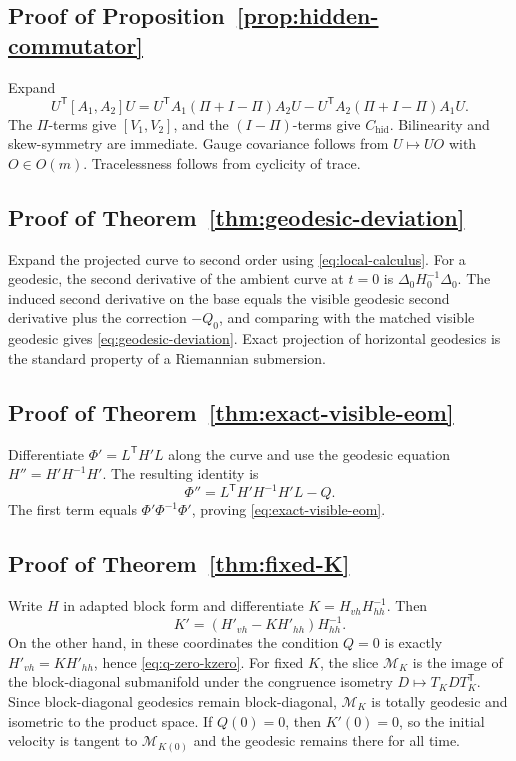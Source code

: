 \documentclass[11pt,a4paper]{article}
\numberwithin{equation}{section}
\theoremstyle{thmcompact}
\theoremstyle{remark}
\begin{document}
\subsection*{Proof of Proposition~\ref{prop:hidden-commutator}}
Expand
\[
U^{\mathsf T}[A_1,A_2]U=U^{\mathsf T}A_1(\Pi+I-\Pi)A_2U-U^{\mathsf T}A_2(\Pi+I-\Pi)A_1U.
\]
The $\Pi$-terms give $[V_1,V_2]$, and the $(I-\Pi)$-terms give $C_{\mathrm{hid}}$. Bilinearity and skew-symmetry are immediate. Gauge covariance follows from $U\mapsto UO$ with $O\in O(m)$. Tracelessness follows from cyclicity of trace.

\subsection*{Proof of Theorem~\ref{thm:geodesic-deviation}}
Expand the projected curve to second order using \eqref{eq:local-calculus}. For a geodesic, the second derivative of the ambient curve at $t=0$ is $\Delta_0H_0^{-1}\Delta_0$. The induced second derivative on the base equals the visible geodesic second derivative plus the correction $-Q_0$, and comparing with the matched visible geodesic gives \eqref{eq:geodesic-deviation}. Exact projection of horizontal geodesics is the standard property of a Riemannian submersion.

\subsection*{Proof of Theorem~\ref{thm:exact-visible-eom}}
Differentiate $\Phi'=L^{\mathsf T}H'L$ along the curve and use the geodesic equation $H''=H'H^{-1}H'$. The resulting identity is
\[
\Phi'' = L^{\mathsf T}H'H^{-1}H'L - Q.
\]
The first term equals $\Phi'\Phi^{-1}\Phi'$, proving \eqref{eq:exact-visible-eom}.

\subsection*{Proof of Theorem~\ref{thm:fixed-K}}
Write $H$ in adapted block form and differentiate $K=H_{vh}H_{hh}^{-1}$. Then
\[
K'=(H'_{vh}-K H'_{hh})H_{hh}^{-1}.
\]
On the other hand, in these coordinates the condition $Q=0$ is exactly $H'_{vh}=K H'_{hh}$, hence \eqref{eq:q-zero-kzero}. For fixed $K$, the slice $\mathcal M_K$ is the image of the block-diagonal submanifold under the congruence isometry $D\mapsto T_KDT_K^{\mathsf T}$. Since block-diagonal geodesics remain block-diagonal, $\mathcal M_K$ is totally geodesic and isometric to the product space. If $Q(0)=0$, then $K'(0)=0$, so the initial velocity is tangent to $\mathcal M_{K(0)}$ and the geodesic remains there for all time.
\end{document}
